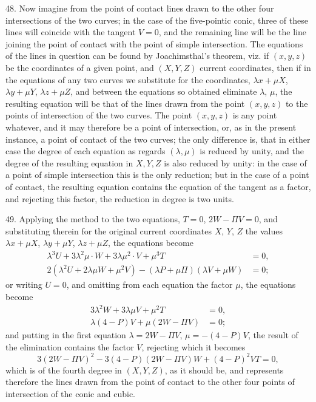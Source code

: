 \documentclass[11pt,a4paper]{article}
\theoremstyle{definition}
\begin{document}
48. Now imagine from the point of contact lines drawn to the other four intersections of the two curves; in the case of the five-pointic conic, three of these lines will coincide with the tangent $V=0$, and the remaining line will be the line joining the point of contact with the point of simple intersection. The equations of the lines in question can be found by Joachimsthal's theorem, viz. if $(x,y,z)$ be the coordinates of a given point, and $(X,Y,Z)$ current coordinates, then if in the equations of any two curves we substitute for the coordinates, $\lambda x+\mu X$, $\lambda y+\mu Y$, $\lambda z+\mu Z$, and between the equations so obtained eliminate $\lambda$, $\mu$, the resulting equation will be that of the lines drawn from the point $(x,y,z)$ to the points of intersection of the two curves. The point $(x,y,z)$ is any point whatever, and it may therefore be a point of intersection, or, as in the present instance, a point of contact of the two curves; the only difference is, that in either case the degree of each equation as regards $(\lambda,\mu)$ is reduced by unity, and the degree of the resulting equation in $X,Y,Z$ is also reduced by unity: in the case of a point of simple intersection this is the only reduction; but in the case of a point of contact, the resulting equation contains the equation of the tangent as a factor, and rejecting this factor, the reduction in degree is two units.

49. Applying the method to the two equations, $T=0$, $2W-\Pi V=0$, and substituting therein for the original current coordinates $X$, $Y$, $Z$ the values $\lambda x+\mu X$, $\lambda y+\mu Y$, $\lambda z+\mu Z$, the equations become
\begin{align*}
\lambda^3U+3\lambda^2\mu\cdot W+3\lambda\mu^2\cdot V+\mu^3T &= 0,\\
2(\lambda^2U+2\lambda\mu W+\mu^2V)-(\lambda P+\mu\Pi)(\lambda V+\mu W) &= 0;
\end{align*}
or writing $U=0$, and omitting from each equation the factor $\mu$, the equations become
\begin{align*}
3\lambda^2W+3\lambda\mu V+\mu^2T &= 0,\\
\lambda(4-P)V+\mu(2W-\Pi V) &= 0;
\end{align*}
and putting in the first equation $\lambda=2W-\Pi V$, $\mu=-(4-P)V$, the result of the elimination contains the factor $V$, rejecting which it becomes
\[
3(2W-\Pi V)^2-3(4-P)(2W-\Pi V)W+(4-P)^2VT=0,
\]
which is of the fourth degree in $(X,Y,Z)$, as it should be, and represents therefore the lines drawn from the point of contact to the other four points of intersection of the conic and cubic.
\end{document}

